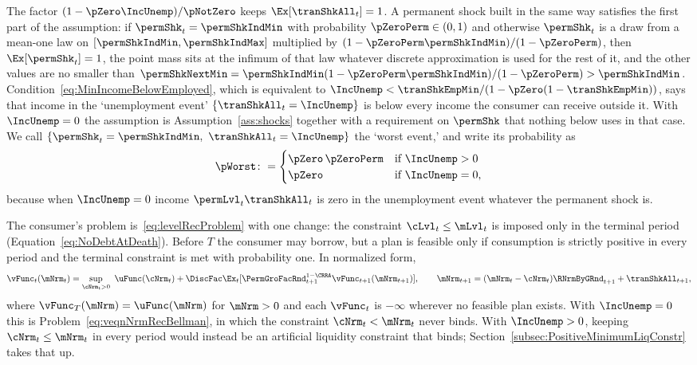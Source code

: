 \documentclass[\econtexRoot/BufferStockTheory]{subfiles}
\begin{document}
The factor $(1-\pZero\IncUnemp)/\pNotZero$ keeps $\Ex[\tranShkAll_{t}]=1$.
A permanent shock built in the same way satisfies the first part of the assumption: if $\permShk_{t}=\permShkIndMin$ with probability $\pZeroPerm\in(0,1)$ and otherwise $\permShk_{t}$ is a draw from a mean-one law on $[\permShkIndMin,\permShkIndMax]$ multiplied by $(1-\pZeroPerm\permShkIndMin)/(1-\pZeroPerm)$, then $\Ex[\permShk_{t}]=1$, the point mass sits at the infimum of that law whatever discrete approximation is used for the rest of it, and the other values are no smaller than $\permShkNextMin=\permShkIndMin(1-\pZeroPerm\permShkIndMin)/(1-\pZeroPerm)>\permShkIndMin$.
Condition~\eqref{eq:MinIncomeBelowEmployed}, which is equivalent to $\IncUnemp<\tranShkEmpMin/(1-\pZero(1-\tranShkEmpMin))$, says that income in the `unemployment event' $\{\tranShkAll_{t}=\IncUnemp\}$ is below every income the consumer can receive outside it.
With $\IncUnemp=0$ the assumption is Assumption~\ref{ass:shocks} together with a requirement on $\permShk$ that nothing below uses in that case.
We call $\{\permShk_{t}=\permShkIndMin,\ \tranShkAll_{t}=\IncUnemp\}$ the `worst event,' and write its probability as
\begin{equation}\label{eq:pWorst}
  \pWorst\colon=
  \begin{cases}
    \pZero\,\pZeroPerm & \text{if $\IncUnemp>0$} \\
    \pZero & \text{if $\IncUnemp=0$,}
  \end{cases}
\end{equation}
because when $\IncUnemp=0$ income $\permLvl_{t}\tranShkAll_{t}$ is zero in the unemployment event whatever the permanent shock is.

The consumer's problem is~\eqref{eq:levelRecProblem} with one change: the constraint $\cLvl_{t}\leq\mLvl_{t}$ is imposed only in the terminal period (Equation~\eqref{eq:NoDebtAtDeath}).
Before $T$ the consumer may borrow, but a plan is feasible only if consumption is strictly positive in every period and the terminal constraint is met with probability one.
In normalized form,
\begin{equation}\label{eq:veqnPositiveMinimum}
  \vFunc_{t}(\mNrm_{t})=\sup_{\cNrm_{t}>0}~\uFunc(\cNrm_{t})+\DiscFac\Ex_{t}[\PermGroFacRnd_{t+1}^{1-\CRRA}\vFunc_{t+1}(\mNrm_{t+1})],\qquad \mNrm_{t+1}=(\mNrm_{t}-\cNrm_{t})\RNrmByGRnd_{t+1}+\tranShkAll_{t+1},
\end{equation}
where $\vFunc_{T}(\mNrm)=\uFunc(\mNrm)$ for $\mNrm>0$ and each $\vFunc_{t}$ is $-\infty$ wherever no feasible plan exists.
With $\IncUnemp=0$ this is Problem~\eqref{eq:veqnNrmRecBellman}, in which the constraint $\cNrm_{t}<\mNrm_{t}$ never binds.
With $\IncUnemp>0$, keeping $\cNrm_{t}\leq\mNrm_{t}$ in every period would instead be an artificial liquidity constraint that binds; Section~\ref{subsec:PositiveMinimumLiqConstr} takes that up.
\end{document}
